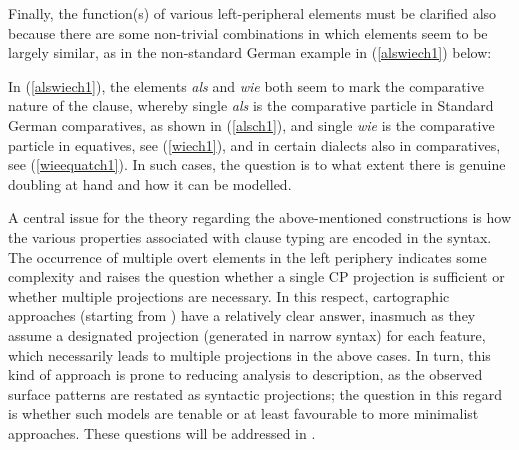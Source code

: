Finally, the function(s) of various left-peripheral elements must be clarified also because there are some non-trivial combinations in which elements seem to be largely similar, as in the non-standard German example in (\ref{alswiech1}) below:

\ea
{}
\z
\z

In (\ref{alswiech1}), the elements \textit{als} and \textit{wie} both seem to mark the comparative nature of the clause, whereby single \textit{als} is the comparative particle in Standard German comparatives, as shown in (\ref{alsch1}), and single \textit{wie} is the comparative particle in equatives, see (\ref{wiech1}), and in certain dialects also in comparatives, see (\ref{wieequatch1}). In such cases, the question is to what extent there is genuine doubling at hand and how it can be modelled.

A central issue for the theory regarding the above-mentioned constructions is how the various properties associated with clause typing are encoded in the syntax. The occurrence of multiple overt elements in the left periphery indicates some complexity and raises the question whether a single CP projection is sufficient or whether multiple projections are necessary. In this respect, cartographic approaches (starting from \citealt{rizzi1997}) have a relatively clear answer, inasmuch as they assume a designated projection (generated in narrow syntax) for each feature, which necessarily leads to multiple projections in the above cases. In turn, this kind of approach is prone to reducing analysis to description, as the observed surface patterns are restated as syntactic projections; the question in this regard is whether such models are tenable or at least favourable to more minimalist approaches. These questions will be addressed in .

